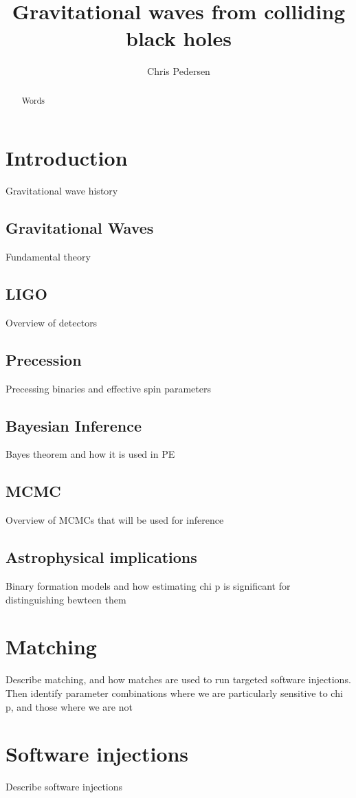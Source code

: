 \documentclass[]{article}
\title{Gravitational waves from colliding black holes}
\author{Chris Pedersen}
\begin{document}
\maketitle

\begin{abstract}
Words
\end{abstract}

\section{Introduction}
Gravitational wave history
\subsection{Gravitational Waves}
Fundamental theory
\subsection{LIGO}
Overview of detectors
\subsection{Precession}
Precessing binaries and effective spin parameters
\subsection{Bayesian Inference}
Bayes theorem and how it is used in PE
\subsection{MCMC}
Overview of MCMCs that will be used for inference
\subsection{Astrophysical implications}
Binary formation models and how estimating chi p is significant for distinguishing bewteen them

\section{Matching}
Describe matching, and how matches are used to run targeted software injections.
Then identify parameter combinations where we are particularly sensitive to chi p, and those where we are not
\section{Software injections}
Describe software injections
\end{document}
